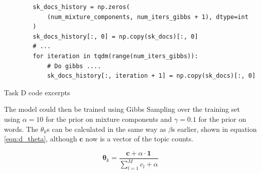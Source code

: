 \documentclass[11pt]{amsart}
\begin{document}
\begin{listing}[h]
    \begin{verbatim}
        sk_docs_history = np.zeros(
            (num_mixture_components, num_iters_gibbs + 1), dtype=int
        )
        sk_docs_history[:, 0] = np.copy(sk_docs)[:, 0]
        # ...
        for iteration in tqdm(range(num_iters_gibbs)):
            # Do gibbs ....
            sk_docs_history[:, iteration + 1] = np.copy(sk_docs)[:, 0]
    \end{verbatim}
    \caption{Task D code excerpts} \label{lst:cw3d}
\end{listing}

The model could then be trained using Gibbs Sampling over the training set using $\alpha = 10$ for the prior on mixture components and $\gamma = 0.1$ for the prior on words. The $\theta_k$s can be calculated in the same way as $\beta$s earlier, shown in equation \ref{eqn:d_theta}, although $\bm{c}$ now is a vector of the topic counts.

\begin{equation} \label{eqn:d_theta}
    \bm{\theta}_{k} = \frac{\bm{c} + \alpha\cdot\mathbf{1}}{\sum_{l=1}^{M}c_l + \alpha}
\end{equation}
\end{document}
